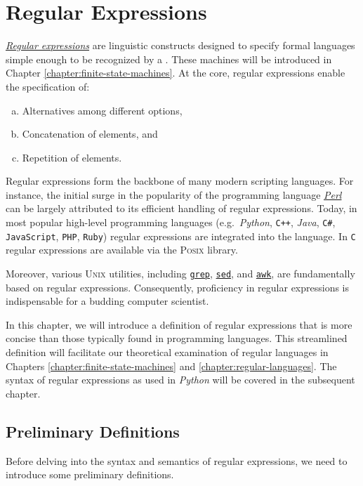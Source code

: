 \chapter{Regular Expressions \label{chapter:regular-expressions}}
\href{http://en.wikipedia.org/wiki/Regular_expression}{\emph{Regular expressions}} 
are linguistic constructs designed to specify formal languages simple enough to be recognized by a
.  These machines will be introduced in Chapter \ref{chapter:finite-state-machines}.
At the core, regular expressions enable the specification of:  
\begin{enumerate}[(a)]
\item Alternatives among different options,
\item Concatenation of elements, and
\item Repetition of elements.
\end{enumerate}

Regular expressions form the backbone of many modern scripting languages. For instance, the initial surge in
the popularity of the programming language \href{http://en.wikipedia.org/wiki/Perl}{\textsl{Perl}} can be
largely attributed to its efficient handling of regular expressions. Today,  in most popular high-level
programming languages (e.g.~\textsl{Python}, \texttt{C++}, \textsl{Java}, \texttt{C\#}, \texttt{JavaScript},
\texttt{PHP}, \texttt{Ruby}) regular expressions are integrated into the language.  In \texttt{C} regular
expressions are available via the \textsc{Posix} library.  

Moreover, various \textsc{Unix} utilities, including \href{http://en.wikipedia.org/wiki/Grep}{\texttt{grep}},
\href{http://en.wikipedia.org/wiki/Sed}{\texttt{sed}}, and
\href{http://en.wikipedia.org/wiki/Awk}{\texttt{awk}}, are fundamentally based on regular
expressions. Consequently, proficiency in regular expressions is indispensable for a budding computer scientist.

In this chapter, we will introduce a definition of regular expressions that is more concise than those typically found in programming languages. This streamlined definition will facilitate our theoretical examination of regular languages in Chapters \ref{chapter:finite-state-machines} and \ref{chapter:regular-languages}. The syntax of regular expressions as used in \textsl{Python} will be covered in the subsequent chapter.

\section{Preliminary Definitions}
Before delving into the syntax and semantics of regular expressions, we need to introduce some preliminary definitions.

